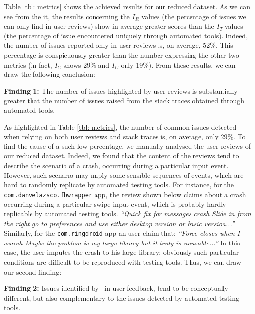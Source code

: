 Table \ref{tbl: metrics} shows the achieved results for our reduced dataset. 
As we can see from the it, the results concerning the $I_R$ values (\ie the percentage of issues we can only find in user reviews) show in average greater scores than the $I_T$ values (\ie the percentage of issue encountered uniquely through automated tools).
Indeed, the number of issues reported only in user reviews is, on average, 52\%. This percentage is conspicuously greater than the number expressing the other two metrics (in fact, $I_C$ shows 29\% and $I_C$ only 19\%). 
From these results, we can draw the following conclusion: 
\smallbreak
\begin{tcolorbox}[colback=white, size=small]
{\small
\textbf{Finding 1:}   The number of issues highlighted 
 by user reviews is substantially greater that the number of issues raised from the stack traces obtained through automated tools.}
 \end{tcolorbox}



As highlighted in Table \ref{tbl: metrics}, the number of common issues detected when relying on both user reviews and stack traces is, on average, only 29\%. 
To find the cause of a such low percentage, we manually analysed the user reviews of our reduced dataset. 
Indeed, we found that the content of the reviews tend to describe the scenario of a crash, occurring during a particular input event.
However, such scenario may imply some sensible sequences of events, which are hard to randomly replicate by automated testing tools. 
For instance, for the \texttt{com.danvelazsco.fbwrapper} app, the review shown below claims about a crash occurring during a particular swipe input event, which is probably hardly replicable by automated testing tools. 
\smallbreak
\emph{\small``Quick fix for messages crash Slide in from the right go to preferences and use either desktop version or basic version...''}
\smallbreak
Similarly, for the \texttt{com.ringdroid} app an user claim that:
\smallbreak
\emph{\small``Force closes when I search Maybe the problem is my large library but it truly is unusable...''}
\smallbreak
In this case, the user imputes the crash to his large library: obviously such particular conditions are difficult to be reproduced with testing tools.
Thus, we can draw our second finding: 




\smallbreak
\begin{tcolorbox}[colback=white, size=small]
{\small 
\textbf{Finding 2:}  Issues identified by \toolname\ in user feedback, tend to be conceptually different, but also complementary to the issues detected by automated testing tools.}
\end{tcolorbox}

